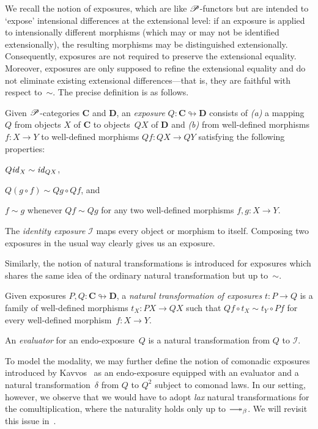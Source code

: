 \documentclass[a4paper,UKenglish,numberwithinsect,cleveref,thm-restate]{lipics-v2021}
\numberwithin{equation}{section}
\theoremstyle{definition}
\theoremstyle{plain}
\begin{document}
We recall the notion of exposures, which are like $\mathscr{P}$-functors but are intended to `expose' intensional differences at the extensional level: if an exposure is applied to intensionally different morphisms (which may or may not be identified extensionally), the resulting morphisms may be distinguished extensionally.
Consequently, exposures are not required to preserve the extensional equality.
Moreover, exposures are only supposed to refine the extensional equality and do not eliminate existing extensional differences---that is, they are faithful with respect to~$\sim$.
The precise definition is as follows.

\begin{definition}
  Given $\mathscr{P}$-categories $\mathbf{C}$ and $\mathbf{D}$, an \emph{exposure} $Q\colon \mathbf{C} \looparrowright \mathbf{D}$ consists of \emph{(a)} a mapping $Q$ from objects $X$ of\/ $\mathbf{C}$ to objects~$QX$ of\/ $\mathbf{D}$ and \emph{(b)} from well-defined morphisms $f\colon X \to Y$ to well-defined morphisms $Qf\colon QX \to QY$ satisfying the following properties:
  \begin{romanenumerate}
    \item $Q\mathit{id}_X \sim \mathit{id}_{QX}$,
    \item $Q(g \circ f) \sim Qg \circ Qf$, and
    \item $f \sim g$ whenever $Qf \sim Qg$ for any two well-defined morphisms $f, g\colon X \to Y$. 
  \end{romanenumerate}
\end{definition}
The \emph{identity exposure} $\mathcal{I}$ maps every object or morphism to itself.
Composing two exposures in the usual way clearly gives us an exposure. 

Similarly, the notion of natural transformations is introduced for exposures which shares the same idea of the ordinary natural transformation but up to~$\sim$.
\begin{definition}
  Given exposures $P, Q\colon \mathbf{C} \looparrowright \mathbf{D}$, a \emph{natural transformation of exposures} $t\colon P \to Q$ is a family of well-defined morphisms $t_X \colon PX \to QX$ such that $Qf \circ t_X \sim t_Y \circ Pf$ for every well-defined morphism~$f\colon X \to Y$. 
\end{definition}
An \emph{evaluator} for an endo-exposure~$Q$ is a natural transformation from $Q$ to $\mathcal{I}$.

To model the \SFour modality, we may further define the notion of comonadic exposures introduced by Kavvos~\cite{Kavvos2017b} as an endo-exposure equipped with an evaluator and a natural transformation~$\delta$ from $Q$ to $Q^2$ subject to comonad laws.
In our setting, however, we observe that we would have to adopt \emph{lax} natural transformations for the comultiplication, where the naturality holds only up to $\reduce$.
We will revisit this issue in~.
\end{document}
